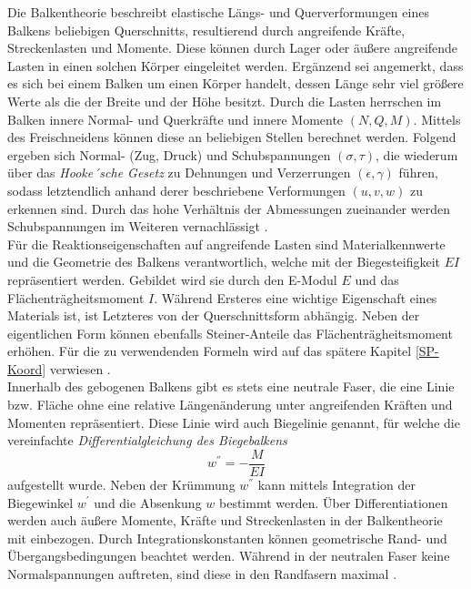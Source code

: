 \noindent Die Balkentheorie beschreibt elastische Längs- und Querverformungen eines Balkens beliebigen Querschnitts, resultierend durch angreifende Kräfte, Streckenlasten und Momente. Diese können durch Lager oder äußere angreifende Lasten in einen solchen Körper eingeleitet werden. Ergänzend sei angemerkt, dass es sich bei einem Balken um einen Körper handelt, dessen Länge sehr viel größere Werte als die der Breite und der Höhe besitzt. Durch die Lasten herrschen im Balken innere Normal- und Querkräfte und innere Momente $(N, Q, M)$. Mittels des Freischneidens können diese an beliebigen Stellen berechnet werden. Folgend ergeben sich Normal- (Zug, Druck) und Schubspannungen $(\sigma, \tau)$, die wiederum über das \textit{Hooke´sche Gesetz} zu Dehnungen und Verzerrungen $(\epsilon, \gamma)$ führen, sodass letztendlich anhand derer beschriebene Verformungen $(u, v, w)$ zu erkennen sind. Durch das hohe Verhältnis der Abmessungen zueinander werden Schubspannungen im Weiteren vernachlässigt \cite{item15}\cite{item16}\cite{item9}. \\

\noindent Für die Reaktionseigenschaften auf angreifende Lasten sind Materialkennwerte und die Geometrie des Balkens verantwortlich, welche mit der Biegesteifigkeit $EI$ repräsentiert werden. Gebildet wird sie durch den E-Modul $E$ und das Flächenträgheitsmoment $I$. Während Ersteres eine wichtige Eigenschaft eines Materials ist, ist Letzteres von der Querschnittsform abhängig. Neben der eigentlichen Form können ebenfalls Steiner-Anteile das Flächenträgheitsmoment erhöhen. Für die zu verwendenden Formeln wird auf das spätere Kapitel \ref{SP-Koord} verwiesen \cite{item16}.\\


\noindent Innerhalb des gebogenen Balkens gibt es stets eine neutrale Faser, die eine Linie bzw. Fläche ohne eine relative Längenänderung unter angreifenden Kräften und Momenten repräsentiert. Diese Linie wird auch Biegelinie genannt, für welche die vereinfachte \textit{Differentialgleichung des Biegebalkens}
\begin{equation}
	w^{''}=-\frac{M}{EI}
\end{equation}
aufgestellt wurde. Neben der Krümmung $w^{''}$ kann mittels Integration der Biegewinkel $w^{'}$ und die Absenkung $w$ bestimmt werden. Über Differentiationen werden auch äußere Momente, Kräfte und Streckenlasten in der Balkentheorie mit einbezogen. Durch Integrationskonstanten können geometrische Rand- und Übergangsbedingungen beachtet werden. Während in der neutralen Faser keine Normalspannungen auftreten, sind diese in den Randfasern maximal \cite{item16}\cite{item9}.\\

